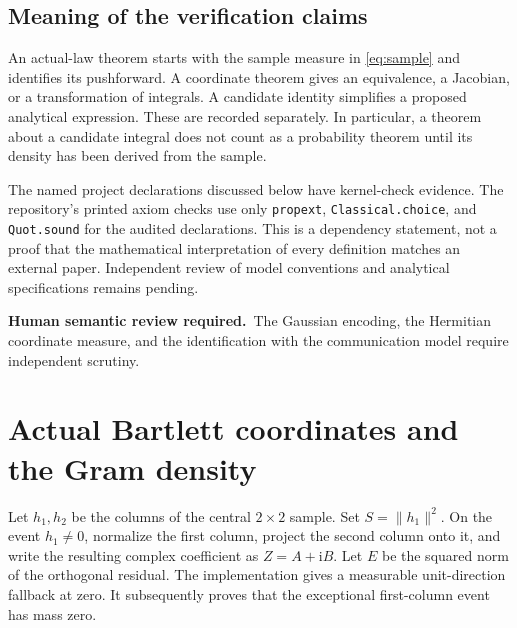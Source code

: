\documentclass[11pt]{article}
\newcommand{\lean}[1]{{\small\nolinkurl{#1}}}
\newcommand{\review}{\par\smallskip\noindent\textbf{Human semantic review required.}\ }
\begin{document}
\subsection{Meaning of the verification claims}
An actual-law theorem starts with the sample measure in
\eqref{eq:sample} and identifies its pushforward. A coordinate theorem gives
an equivalence, a Jacobian, or a transformation of integrals. A candidate
identity simplifies a proposed analytical expression. These are recorded
separately. In particular, a theorem about a candidate integral does not count
as a probability theorem until its density has been derived from the sample.

The named project declarations discussed below have kernel-check evidence.
The repository's printed axiom checks use only
\lean{propext}, \lean{Classical.choice}, and \lean{Quot.sound} for the audited
declarations. This is a dependency statement, not a proof that the mathematical
interpretation of every definition matches an external paper. Independent
review of model conventions and analytical specifications remains pending.
\review The Gaussian encoding, the Hermitian coordinate measure, and the
identification with the communication model require independent scrutiny.

\section{Actual Bartlett coordinates and the Gram density}\label{sec:density}
Let $h_1,h_2$ be the columns of the central $2\times2$ sample.
Set $S=\|h_1\|^2$. On the event $h_1\ne0$, normalize the first column, project
the second column onto it, and write the resulting complex coefficient as
$Z=A+\mathrm{i}B$. Let $E$ be the squared norm of the orthogonal residual.
The implementation gives a measurable unit-direction fallback at zero.
It subsequently proves that the exceptional first-column event has mass zero.
\end{document}
